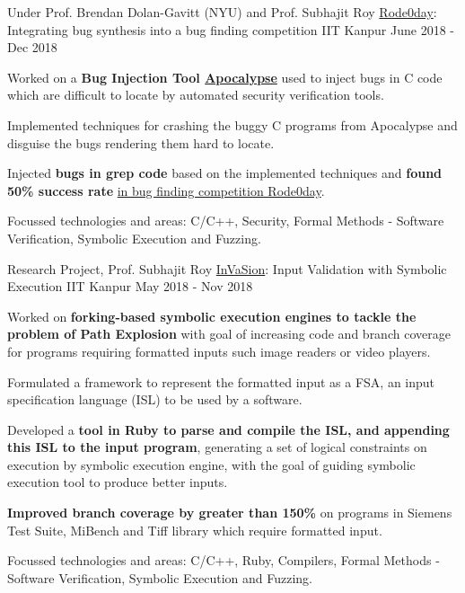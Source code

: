 \begin{cventries}


  \cventry
    {Under Prof. Brendan Dolan-Gavitt (NYU) and Prof. Subhajit Roy} %
    {\href{https://rode0day.mit.edu/}{Rode0day}: Integrating bug synthesis into a bug finding competition} %
    {IIT Kanpur} %
    {June 2018 - Dec 2018} %
    {
      \begin{cvitems} %
        \item {Worked on a \textbf{Bug Injection Tool \href{https://dl.acm.org/doi/abs/10.1145/3236024.3236084}{Apocalypse}} used to inject bugs in C code which are difficult to locate by automated security verification tools.}
        \item {Implemented techniques for crashing the buggy C programs from Apocalypse and disguise the bugs rendering them hard to locate.}
        \item {Injected \textbf{bugs in grep code} based on the implemented techniques and \textbf{found 50\% success rate} \href{https://rode0day.mit.edu/results/4}{in bug finding competition Rode0day}.}
        \item {Focussed technologies and areas: C/C++, Security, Formal Methods - Software Verification, Symbolic Execution and Fuzzing.}
      \end{cvitems}
    }





  \cventry
    {Research Project, Prof. Subhajit Roy} %
    {\href{https://arxiv.org/abs/2104.01438}{InVaSion}: Input Validation with Symbolic Execution} %
    {IIT Kanpur} %
    {May 2018 - Nov 2018} %
    {
      \begin{cvitems} %
      \item {Worked on \textbf{forking-based symbolic execution engines to tackle the problem of Path Explosion} with goal of increasing code and branch coverage for programs requiring formatted inputs such image readers or video players.}
      \item {Formulated a framework to represent the formatted input as a FSA, an input specification language (ISL) to be used by a software.}
        \item {Developed a \textbf{tool in Ruby to parse and compile the ISL, and appending this ISL to the input program}, generating a set of logical constraints on execution by symbolic execution engine, with the goal of guiding symbolic execution tool to produce better inputs.}
        \item {\textbf{Improved branch coverage by greater than 150\%} on programs in Siemens Test Suite, MiBench and Tiff library which require formatted input.}
        \item {Focussed technologies and areas: C/C++, Ruby, Compilers, Formal Methods - Software Verification, Symbolic Execution and Fuzzing.}
      \end{cvitems}
    }%


\end{cventries}
